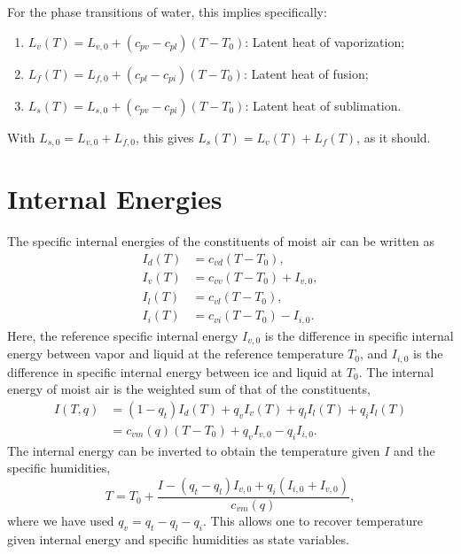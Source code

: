 \documentclass{report}
\begin{document}
For the phase transitions of water, this implies specifically:
\begin{enumerate}
    \item $L_v(T) = L_{v,0} + (c_{pv} - c_{pl}) (T - T_0)$: Latent heat of vaporization;
    \item $L_f(T) = L_{f,0} + (c_{pl} - c_{pi}) (T - T_0)$: Latent heat of fusion;
    \item $L_s(T) = L_{s,0} + (c_{pv} - c_{pi}) (T - T_0)$: Latent heat of sublimation.
\end{enumerate}
With $L_{s,0} = L_{v,0} + L_{f,0}$, this gives $L_s(T) = L_v(T) + L_f(T)$, as it should.

\section{Internal Energies}\label{s:internal_energies}

The specific internal energies of the constituents of moist air can be written as
\begin{subequations}\label{e:internal_energies}
\begin{align}
I_d(T) & = c_{vd} (T - T_0),  \\
I_v(T) & = c_{vv} (T - T_0) + I_{v,0},\\
I_l(T) & = c_{vl} (T - T_0), \\
I_i(T) & = c_{vi} (T - T_0) - I_{i,0}.
\end{align}
\end{subequations}
Here, the reference specific internal energy $I_{v,0}$ is the difference in specific internal energy between vapor and liquid at the reference temperature $T_0$, and $I_{i,0}$ is the difference in specific internal energy between ice and liquid at $T_0$. The internal energy of moist air is the weighted sum of that of the constituents,
\begin{equation}
\begin{split}
     I(T, q) & = (1-q_t) I_d(T) + q_v I_v(T) + q_l I_l(T) + q_i I_l(T)\\
          & = c_{vm}(q) (T - T_0)  + q_v I_{v,0} - q_i I_{i,0}.
     \label{eq:total_internal_energy}
\end{split}
\end{equation}
The internal energy can be inverted to obtain the temperature given $I$ and the specific humidities,
\begin{equation}
    T = T_0 + \frac{I - (q_t - q_l) I_{v,0} + q_i (I_{i,0} + I_{v,0})}{c_{vm}(q)},
    \label{eq:temperature}
\end{equation}
where we have used $q_v = q_t - q_l - q_i$. This allows one to recover temperature given internal energy and specific humidities as state variables.
\end{document}
